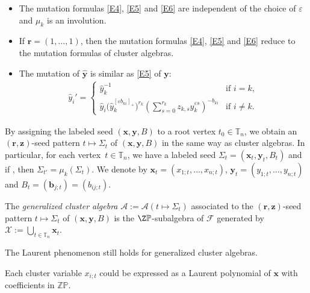 \begin{Remark}\label{R1}\quad
\begin{itemize}\itemsep=0pt
\item[(1)] The mutation formulas \eqref{E4}, \eqref{E5} and \eqref{E6} are independent of the choice of $\varepsilon$ and $\mu_k$ is an involution.
 \item[(2)] If $\mathbf{r}=(1,\dots,1)$, then the mutation formulas \eqref{E4}, \eqref{E5} and \eqref{E6} reduce to the mutation formulas of cluster algebras.
 \item[(3)] The mutation of $\hat{\mathbf{y}}$ is similar as \eqref{E5} of $\mathbf{y}$:
 \begin{align*}
 \hat{y}_i'=
 \begin{cases}
 \hat{y}_k^{-1} & \text{if $i= k$}, \\
 \displaystyle \hat{y}_i\bigl(\hat{y}_k^{[\varepsilon b_{ki}]_+}\bigr)^{r_k}\left(\sum\limits_{s=0}^{r_k}z_{k,s}\hat{y}_k^{\varepsilon s}\right)^{-b_{ki}}& \text{if $i\neq k$}.
 \end{cases}
 \end{align*}
\end{itemize}
\end{Remark}

By assigning the labeled seed $(\mathbf{x},\mathbf{y}, B)$ to a root vertex $t_0\in \mathbb{T}_n$, we obtain an $(\mathbf{r},\mathbf{z})$-seed pattern $t\mapsto \Sigma_t$ of $(\mathbf{x},\mathbf{y}, B)$ in the same way as cluster algebras. In particular, for each vertex~${t\in \mathbb{T}_n}$, we have a labeled seed $\Sigma_t=(\mathbf{x}_t, \mathbf{y}_t, B_t)$ and if , then $\Sigma_{t'}=\mu_k(\Sigma_t)$. We denote by $\mathbf{x}_t=(x_{1;t},\dots, x_{n;t})$, $\mathbf{y}_t=(y_{1;t},\dots,y_{n;t})$ and $B_t=(\mathbf{b}_{j;t})=(b_{ij;t})$.
\begin{Definition}
 The {\it generalized cluster algebra} $\mathcal{A}:=\mathcal{A}(t\mapsto \Sigma_t)$ associated to the $(\mathbf{r},\mathbf{z})$-seed pattern $t\mapsto \Sigma_t$ of $(\mathbf{x},\mathbf{y}, B)$ is the $\Z \mathbb{P}$-subalgebra of $\mathcal{F}$ generated by
 $\mathcal{X}:=\bigcup_{t\in \mathbb{T}_n}\mathbf{x}_t$.
\end{Definition}
The Laurent phenomenon still holds for generalized cluster algebras.
\begin{Proposition}\label{P6}
 Each cluster variable $x_{i;t}$ could be expressed as a Laurent polynomial of $\mathbf{x}$ with coefficients in $\mathbb{Z}\mathbb{P}$.
\end{Proposition}

